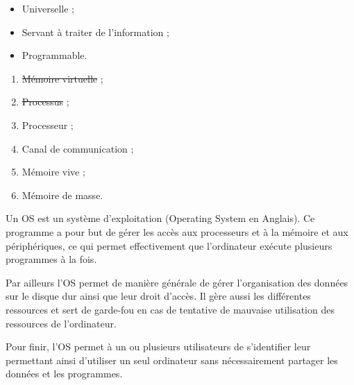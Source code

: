 \begin{minipage}{0.5\textwidth}
\question{}

\begin{itemize}
\item Universelle ; 
\item Servant à traiter de l'information ;
\item Programmable.
\end{itemize}
\end{minipage}
\begin{minipage}{0.5\textwidth}
\question{}

\begin{enumerate}[label=(\alph*)]
\item \sout{Mémoire virtuelle} ;
\item \sout{Processus} ;
\item Processeur ;
\item Canal de communication ;
\item Mémoire vive ;
\item Mémoire de masse.
\end{enumerate}
\end{minipage}





\question{}

Un OS est un système d'exploitation (Operating System en Anglais). 
Ce programme a pour but de gérer les accès aux processeurs et à la mémoire et aux périphériques, ce qui permet effectivement que l'ordinateur exécute plusieurs programmes à la fois.

Par ailleurs l'OS permet de manière générale de gérer l'organisation des données sur le disque dur ainsi que leur droit d'accès. Il gère aussi les différentes ressources et sert de garde-fou en cas de tentative de mauvaise utilisation des ressources de l'ordinateur.

Pour finir, l'OS permet à un ou plusieurs utilisateurs de s'identifier leur permettant ainsi d'utiliser un seul ordinateur sans nécessairement partager les données et les programmes. 